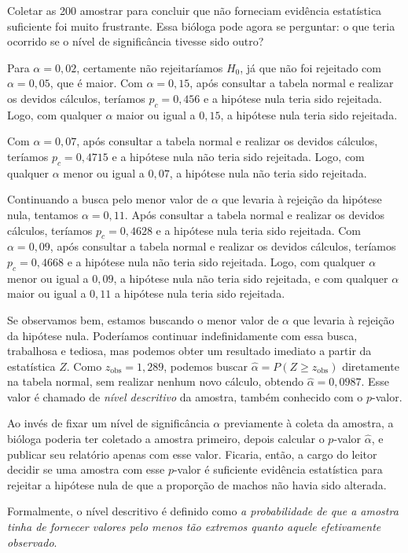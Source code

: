 \documentclass[12pt,a4paper]{article}
\theoremstyle{plain}
\theoremstyle{definition}
\theoremstyle{remark}
\begin{document}
Coletar as 200 amostrar para concluir que não forneciam evidência estatística suficiente foi muito frustrante.
Essa bióloga pode agora se perguntar: o que teria ocorrido se o nível de significância tivesse sido outro?

Para $\alpha=0,02$, certamente não rejeitaríamos $H_0$, já que não foi rejeitado com $\alpha=0,05$, que é maior.
Com $\alpha=0,15$, após consultar a tabela normal e realizar os devidos cálculos, teríamos $p_c = 0,456$ e a hipótese nula teria sido rejeitada.
Logo, com qualquer $\alpha$ maior ou igual a $0,15$, a hipótese nula teria sido rejeitada.

Com $\alpha=0,07$, após consultar a tabela normal e realizar os devidos cálculos, teríamos $p_c = 0,4715$ e a hipótese nula não teria sido rejeitada.
Logo, com qualquer $\alpha$ menor ou igual a $0,07$, a hipótese nula não teria sido rejeitada.

Continuando a busca pelo menor valor de $\alpha$ que levaria à rejeição da hipótese nula, tentamos $\alpha=0,11$.
Após consultar a tabela normal e realizar os devidos cálculos, teríamos $p_c = 0,4628$ e a hipótese nula teria sido rejeitada.
Com $\alpha=0,09$, após consultar a tabela normal e realizar os devidos cálculos, teríamos $p_c = 0,4668$ e a hipótese nula não teria sido rejeitada.
Logo, com qualquer $\alpha$ menor ou igual a $0,09$, a hipótese nula não teria sido rejeitada, e com qualquer $\alpha$ maior ou igual a $0,11$ a hipótese nula teria sido rejeitada.

Se observamos bem, estamos buscando o menor valor de $\alpha$ que levaria à rejeição da hipótese nula.
Poderíamos continuar indefinidamente com essa busca, trabalhosa e tediosa, mas podemos obter um resultado imediato a partir da estatística $Z$.
Como $z_{\mathrm{obs}}=1,289$, podemos buscar $\hat{\alpha}=P(Z \geq z_{\mathrm{obs}})$ diretamente na tabela normal, sem realizar nenhum novo cálculo, obtendo $\hat{\alpha}=0,0987$.
Esse valor é chamado de \emph{nível descritivo} da amostra, também conhecido com o $p$-valor.

Ao invés de fixar um nível de significância $\alpha$ previamente à coleta da amostra, a bióloga poderia ter coletado a amostra primeiro, depois calcular o $p$-valor $\hat{\alpha}$, e publicar seu relatório apenas com esse valor. Ficaria, então, a cargo do leitor decidir se uma amostra com esse $p$-valor é suficiente evidência estatística para rejeitar a hipótese nula de que a proporção de machos não havia sido alterada.

Formalmente, o nível descritivo é definido como \emph{a probabilidade de que a amostra tinha de fornecer valores pelo menos tão extremos quanto aquele efetivamente observado}.
\end{document}
